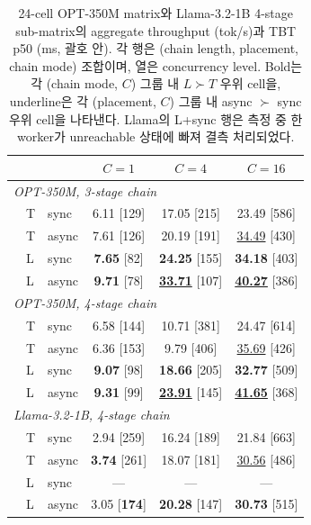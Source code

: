\documentclass[10pt,twocolumn,a4paper]{article}
\begin{document}
\begin{table}[!t]
  \centering\footnotesize
  \caption{24-cell OPT-350M matrix와 Llama-3.2-1B 4-stage
  sub-matrix의 aggregate throughput (tok/s)과 TBT p50 (ms, 괄호 안).
  각 행은 (chain length, placement, chain mode) 조합이며, 열은
  concurrency level. Bold는 각 (chain mode, $C$) 그룹 내
  $L\!\succ\!T$ 우위 cell을, underline은 각 (placement, $C$) 그룹
  내 async $\succ$ sync 우위 cell을 나타낸다. Llama의 L+sync 행은
  측정 중 한 worker가 unreachable 상태에 빠져 결측 처리되었다.}
  \label{tab:matrix}
  \captionsetup{name=Table,labelfont=bf,labelsep=period}
  \begin{tabular}{l l l ccc}
    \toprule
    & & & $C{=}1$ & $C{=}4$ & $C{=}16$ \\
    \midrule
    \multicolumn{6}{l}{\emph{OPT-350M, 3-stage chain}} \\
    & T & sync  & 6.11 [129] & 17.05 [215] & 23.49 [586] \\
    & T & async & 7.61 [126] & 20.19 [191] & \underline{34.49} [430] \\
    & L & sync  & \textbf{7.65} [82] & \textbf{24.25} [155] & \textbf{34.18} [403] \\
    & L & async & \textbf{9.71} [78] & \textbf{\underline{33.71}} [107] & \textbf{\underline{40.27}} [386] \\
    \midrule
    \multicolumn{6}{l}{\emph{OPT-350M, 4-stage chain}} \\
    & T & sync  & 6.58 [144] & 10.71 [381] & 24.47 [614] \\
    & T & async & 6.36 [153] &  9.79 [406] & \underline{35.69} [426] \\
    & L & sync  & \textbf{9.07} [98] & \textbf{18.66} [205] & \textbf{32.77} [509] \\
    & L & async & \textbf{9.31} [99] & \textbf{\underline{23.91}} [145] & \textbf{\underline{41.65}} [368] \\
    \midrule
    \multicolumn{6}{l}{\emph{Llama-3.2-1B, 4-stage chain}} \\
    & T & sync  & 2.94 [259] & 16.24 [189] & 21.84 [663] \\
    & T & async & \textbf{3.74} [261] & 18.07 [181] & \underline{30.56} [486] \\
    & L & sync  & --- & --- & --- \\
    & L & async & 3.05 [\textbf{174}] & \textbf{20.28} [147] & \textbf{30.73} [515] \\
    \bottomrule
  \end{tabular}
\end{table}
\end{document}
